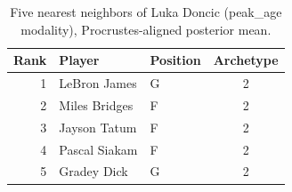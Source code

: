 \begin{table}[htbp]
  \centering\small
  \begin{tabular}{rllc}
    \toprule
    Rank & Player & Position & Archetype \\
    \midrule
    1 & LeBron James & G & 2 \\
    2 & Miles Bridges & F & 2 \\
    3 & Jayson Tatum & F & 2 \\
    4 & Pascal Siakam & F & 2 \\
    5 & Gradey Dick & G & 2 \\
    \bottomrule
  \end{tabular}
  \caption{Five nearest neighbors of Luka Doncic (peak_age modality), Procrustes-aligned posterior mean.}
  \label{tab:Luka_Doncic_neighbors_peak_age}
\end{table}


